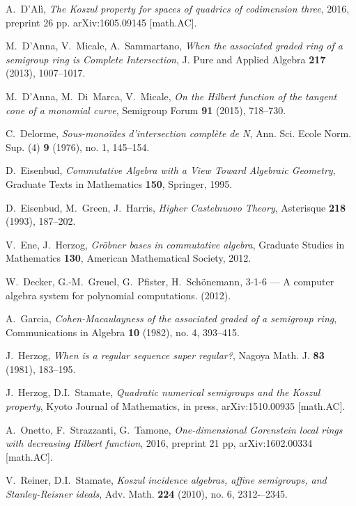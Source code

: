 \documentclass[12pt]{amsart}
\begin{document}
\begin{thebibliography}{}
 A.~D'Al\`i, \textit{The Koszul property for spaces of quadrics of codimension three}, 2016, preprint 26 pp.	arXiv:1605.09145 [math.AC].

 M.~D'Anna, V.~Micale, A.~Sammartano, \textit{When the associated graded ring of a semigroup ring is Complete Intersection}, 
J. Pure and Applied Algebra {\bf 217} (2013), 1007--1017.

 M.~D'Anna,  M.~Di~Marca, V.~Micale, \textit{On the Hilbert function of the tangent cone of a monomial curve}, 
Semigroup Forum {\bf 91} (2015), 718--730.   
		
				
 C.~Delorme, \textit{Sous-mono\"ides d'intersection compl\`ete de N}, Ann. Sci. Ecole Norm. Sup. (4) {\bf 9} (1976), no. 1, 145--154.

 D.~Eisenbud, \textit{Commutative Algebra with a View Toward Algebraic Geometry}, Graduate Texts in Mathematics {\bf 150}, Springer, 1995.

 D.~Eisenbud, M.~Green, J.~Harris, \textit{Higher Castelnuovo Theory}, Asterisque {\bf 218} (1993), 187--202.
 
 V.~Ene, J.~Herzog, \textit{Gr\"obner bases in commutative algebra},  Graduate Studies in Mathematics {\bf 130},
American Mathematical Society, 2012.

 W.~Decker, G.-M.~Greuel, G.~Pfister, H.~Sch{\"o}nemann,
 {3-1-6} --- {A} computer algebra system for polynomial computations.
 (2012).

 A.~Garcia, \textit{Cohen-Macaulayness of the associated graded of a semigroup ring}, Communications in Algebra {\bf 10} (1982), no. 4, 393--415. 
 
 J.~Herzog,   \textit{When is a regular sequence super regular?}, Nagoya Math. J. {\bf 83} (1981), 183--195.
 
 J.~Herzog, D.I.~Stamate, \textit{Quadratic numerical semigroups and the Koszul property}, Kyoto Journal of Mathematics, in press, arXiv:1510.00935 [math.AC]. 
 
 A.~Onetto, F.~Strazzanti, G.~Tamone, \textit{One-dimensional Gorenstein local rings with decreasing Hilbert function}, 2016, preprint 21 pp, arXiv:1602.00334 [math.AC].

 V.~Reiner, D.I.~Stamate, \textit{Koszul incidence algebras, affine semigroups, and Stanley-Reisner ideals}, Adv. Math. {\bf 224} (2010), no. 6, 2312-–2345. 


\end{thebibliography}
\end{document}
